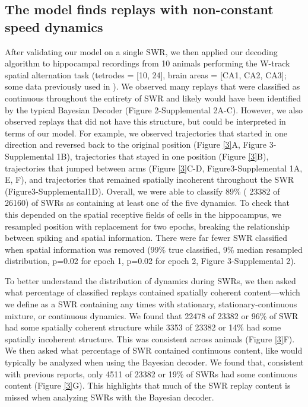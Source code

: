 \documentclass[times, twoside]{zHenriquesLab-StyleBioRxiv}
\begin{document}
\subsection*{The model finds replays with non-constant speed dynamics}
After validating our model on a single SWR, we then applied our decoding algorithm to hippocampal recordings from 10 animals performing the W-track spatial alternation task (tetrodes = [10, 24], brain areas = [CA1, CA2, CA3]; some data previously used in \cite{KarlssonAwakereplayremote2009}). We observed many replays that were classified as continuous throughout the entirety of SWR and likely would have been identified by the typical Bayesian Decoder (Figure 2-Supplemental 2A-C). However, we also observed replays that did not have this structure, but could be interpreted in terms of our model. For example, we observed trajectories that started in one direction and reversed back to the original position (Figure \ref{3}A, Figure 3-Supplemental 1B), trajectories that stayed in one position (Figure \ref{3}B), trajectories that jumped between arms (Figure \ref{3}C-D, Figure3-Supplemental 1A, E, F), and trajectories that remained spatially incoherent throughout the SWR (Figure3-Supplemental1D). Overall, we were able to classify 89\% ( 23382 of 26160) of SWRs as containing at least one of the five dynamics. To check that this depended on the spatial receptive fields of cells in the hippocampus, we resampled position with replacement for two epochs, breaking the relationship between spiking and spatial information. There were far fewer SWR classified when spatial information was removed (99\% true classified, 9\% median resampled distribution, p=0.02 for epoch 1, p=0.02 for epoch 2, Figure 3-Supplemental 2).

To better understand the distribution of dynamics during SWRs, we then asked what percentage of classified replays contained spatially coherent content---which we define as a SWR containing any times with stationary, stationary-continuous mixture, or continuous dynamics. We found that 22478 of 23382 or 96\% of SWR had some spatially coherent structure while 3353 of 23382 or 14\% had some spatially incoherent structure. This was consistent across animals (Figure \ref{3}F). We then asked what percentage of SWR contained continuous content, like would typically be analyzed when using the Bayesian decoder. We found that, consistent with previous reports, only 4511 of  23382 or 19\% of SWRs had some continuous content (Figure \ref{3}G). This highlights that much of the SWR replay content is missed when analyzing SWRs with the Bayesian decoder.
\end{document}
